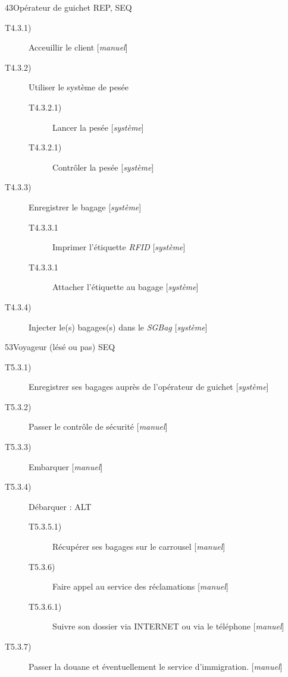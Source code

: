 \dta
{4}{3}{Opérateur de guichet}
{REP, SEQ}
{
\begin{description}
	\item [T4.3.1)] Acceuillir le client [\textsl{manuel}]
	\item [T4.3.2)] Utiliser le système de pesée
	\begin{description}
		\item [T4.3.2.1)] Lancer la pesée [\textsl{système}]
		\item [T4.3.2.1)] Contrôler la pesée [\textsl{système}]
	\end{description}
	\item [T4.3.3)] Enregistrer le bagage [\textsl{système}]
	\begin{description}
		\item [T4.3.3.1] Imprimer l'étiquette \textsl{RFID} [\textsl{système}]
		\item [T4.3.3.1] Attacher l'étiquette au bagage [\textsl{système}]
	\end{description}
	\item [T4.3.4)] Injecter le(s) bagages(s) dans le \textsl{SGBag}  [\textsl{système}]
\end{description}
}

\dta
{5}{3}{Voyageur (lésé ou pas)}
{SEQ}
{
\begin{description}
	\item [T5.3.1)] Enregistrer ses bagages auprès de l'opérateur de guichet [\textsl{système}]
	\item [T5.3.2)] Passer le contrôle de sécurité [\textsl{manuel}]
	\item [T5.3.3)] Embarquer [\textsl{manuel}]
	\item [T5.3.4)] Débarquer : ALT
	\begin{description}
		\item [T5.3.5.1)] Récupérer ses bagages sur le carrousel [\textsl{manuel}]
		\item [T5.3.6)] Faire appel au service des réclamations [\textsl{manuel}]
		\item [T5.3.6.1)] Suivre son dossier via INTERNET ou via le téléphone [\textsl{manuel}]
	\end{description}
	\item [T5.3.7)] Passer la douane et éventuellement le service d'immigration. [\textsl{manuel}]
\end{description}
}

